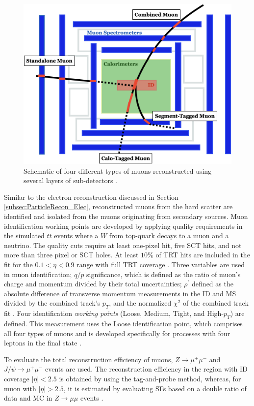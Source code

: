 \begin{figure}[!htb]
    \centering
    \includegraphics[width=0.7\linewidth]{figures/LHC/MuonTypes.png}
    \caption{ Schematic of four different types of muons reconstructed using several layers of sub-detectors \cite{MuonFig}.\label{fig:MuonFig}}
\end{figure}

Similar to the electron reconstruction discussed in Section \ref{subsec:ParticleRecon_Elec}, reconstructed muons from the hard scatter are identified and isolated from the muons originating from secondary sources. Muon identification working points are developed by applying quality requirements in the simulated $t\bar{t}$ events where a $W$ from top-quark decays to a muon and a neutrino. The quality cuts require at least one-pixel hit, five SCT hits, and not more than three pixel or SCT holes. At least $10\%$ of TRT hits are included in the fit for the $0.1<\eta<0.9$ range with full TRT coverage \cite{MuonReco}. Three variables are used in muon identification; $q/p$ significance, which is defined as the ratio of muon's charge and momentum divided by their total uncertainties; $\rho^{'}$ defined as the absolute difference of transverse momentum measurements in the ID and MS divided by the combined track's $p_{T}$, and the normalized $\chi ^{2}$ of the combined track fit \cite{MuonReco}. 
Four identification \textit{working points} (Loose, Medium, Tight, and High-$p_{T}$) are defined. This measurement uses the Loose identification point, which comprises all four types of muons and is developed specifically for processes with four leptons in the final state  \cite{MuonReco}. 

To evaluate the total reconstruction efficiency of muons, $Z \rightarrow \mu^{+}\mu^{-}$ and $J/\psi \rightarrow \mu^{+}\mu^{-}$ events are used. The reconstruction efficiency in the region with ID coverage $|\eta|<2.5$ is obtained by using the tag-and-probe method, whereas, for muon with $|\eta|>2.5$, it is estimated by evaluating SFs based on a double ratio of data and MC in $Z \rightarrow \mu\mu$ events \cite{MuonEffLargeEta}.

